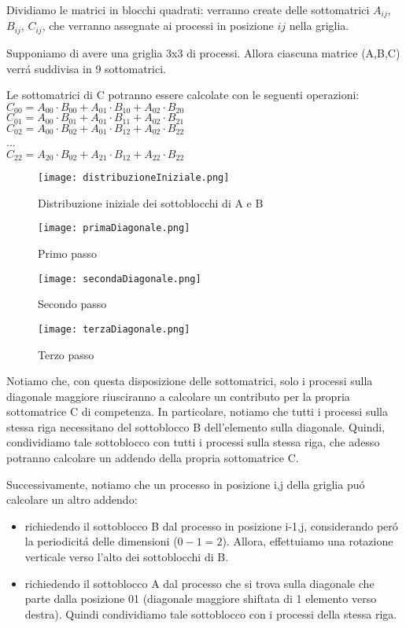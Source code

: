 Dividiamo le matrici in blocchi quadrati: verranno create delle sottomatrici $A_{ij}$, $B_{ij}$, $C_{ij}$, che verranno assegnate ai processi in posizione $ij$ nella griglia.

Supponiamo di avere una griglia 3x3 di processi. Allora ciascuna matrice (A,B,C) verrá suddivisa in 9 sottomatrici.

Le sottomatrici di C potranno essere calcolate con le seguenti operazioni:
$C_{00} = A_{00}\cdot B_{00} + A_{01}\cdot B_{10} + A_{02}\cdot B_{20}$ \\
$C_{01} = A_{00}\cdot B_{01} + A_{01}\cdot B_{11} + A_{02}\cdot B_{21}$ \\
$C_{02} = A_{00}\cdot B_{02} + A_{01}\cdot B_{12} + A_{02}\cdot B_{22}$ \\
... \\
$C_{22} = A_{20}\cdot B_{02} + A_{21}\cdot B_{12} + A_{22}\cdot B_{22}$ \\


\begin{figure}[!htbp]
    \centering
    \texttt{[image: distribuzioneIniziale.png]}
    \caption{Distribuzione iniziale dei sottoblocchi di A e B}
    \label{fig:enter-label}
\end{figure}  
\begin{figure}[!htbp]
    \centering
    \texttt{[image: primaDiagonale.png]}
    \caption{Primo passo}
    \label{fig:enter-label}
\end{figure}  
\begin{figure}[!htbp]
    \centering
    \texttt{[image: secondaDiagonale.png]}
    \caption{Secondo passo}
    \label{fig:enter-label}
\end{figure}  
\begin{figure}[!htbp]
    \centering
    \texttt{[image: terzaDiagonale.png]}
    \caption{Terzo passo}
    \label{fig:enter-label}
\end{figure}  

Notiamo che, con questa disposizione delle sottomatrici, solo i processi sulla diagonale maggiore riusciranno a calcolare un contributo per la propria sottomatrice C di competenza. In particolare, notiamo che tutti i processi sulla stessa riga necessitano del sottoblocco B dell'elemento sulla diagonale. Quindi, condividiamo tale sottoblocco con tutti i processi sulla stessa riga, che adesso potranno calcolare un addendo della propria sottomatrice C.

Successivamente, notiamo che un processo in posizione i,j della griglia puó calcolare un altro addendo: 
\begin{itemize}
    \item richiedendo il sottoblocco B dal processo in posizione i-1,j, considerando peró la periodicitá delle dimensioni ($0 - 1 = 2$). Allora, effettuiamo una rotazione verticale verso l'alto dei sottoblocchi di B.
    \item richiedendo il sottoblocco A dal processo che si trova sulla diagonale che parte dalla posizione 01 (diagonale maggiore shiftata di 1 elemento verso destra). Quindi condividiamo tale sottoblocco con i processi della stessa riga.
\end{itemize}


